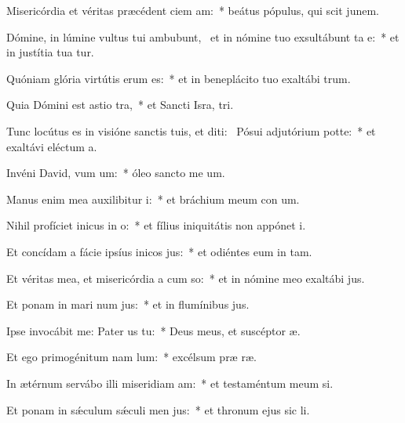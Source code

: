 \item Misericórdia et véritas præcédent ciem am:~* beátus pópulus, qui scit junem.
\item Dómine, in lúmine vultus tui ambubunt,~\pscross{} et in nómine tuo exsultábunt ta e:~* et in justítia tua tur.
\item Quóniam glória virtútis erum  es:~* et in beneplácito tuo exaltábi  trum.
\item Quia Dómini est astio tra,~* et Sancti Isra,  tri.
\item Tunc locútus es in visióne sanctis tuis, et diti:~\pscross{} Pósui adjutórium  potte:~* et exaltávi eléctum   a.
\item Invéni David, vum um:~* óleo sancto me  um.
\item Manus enim mea auxilibitur i:~* et bráchium meum con um.
\item Nihil profíciet inicus in o:~* et fílius iniquitátis non appónet  i.
\item Et concídam a fácie ipsíus inicos jus:~* et odiéntes eum in  tam.
\item Et véritas mea, et misericórdia a cum so:~* et in nómine meo exaltábi  jus.
\item Et ponam in mari num jus:~* et in flumínibus  jus.
\item Ipse invocábit me: Pater us  tu:~* Deus meus, et suscéptor  æ.
\item Et ego primogénitum nam lum:~* excélsum præ  ræ.
\item In ætérnum servábo illi miseridiam am:~* et testaméntum meum  si.
\item Et ponam in sǽculum sǽculi men jus:~* et thronum ejus sic  li.

